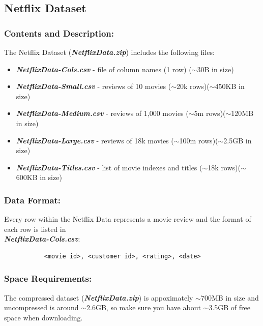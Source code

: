 \documentclass{article}
\begin{document}
\subsection{Netflix Dataset}

\subsubsection*{Contents and Description:}
The Netflix Dataset (\textbf{\textit{NetflixData.zip}}) includes the following files:
\begin{itemize}
    \item \textit{\textbf{NetflixData-Cols.csv}} - file of column names (1 row) ($\sim$30B in size)
    \item \textit{\textbf{NetflixData-Small.csv}} - reviews of 10 movies ($\sim$20k rows)($\sim$450KB in size)
    \item \textit{\textbf{NetflixData-Medium.csv}} - reviews of 1,000 movies ($\sim$5m rows)($\sim$120MB in size)
    \item \textit{\textbf{NetflixData-Large.csv}} - reviews of 18k movies ($\sim$100m rows)($\sim$2.5GB in size)
    \item \textit{\textbf{NetflixData-Titles.csv}} - list of movie indexes and titles ($\sim$18k rows)($\sim$600KB in size)
\end{itemize}

\subsubsection*{Data Format:}
Every row within the Netflix Data represents a movie review and the format of each row is listed in \\ \textbf{\textit{NetflixData-Cols.csv}}:

\large
\begin{verbatim}
           <movie id>, <customer id>, <rating>, <date>
\end{verbatim}
\normalsize

\subsubsection*{Space Requirements:}
The compressed dataset (\textbf{\textit{NetflixData.zip}}) is appoximately $\sim$700MB in size and uncompressed is around $\sim$2.6GB, so make sure you have about $\sim$3.5GB of free space when downloading.
\end{document}
